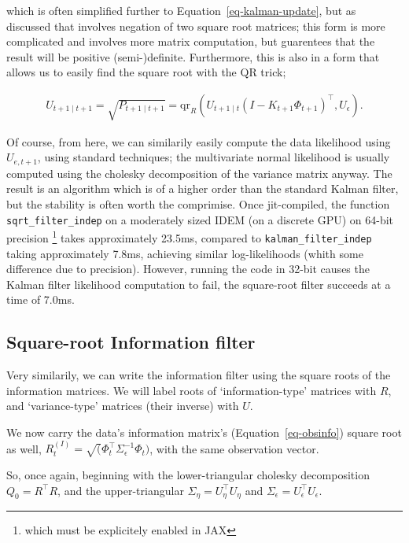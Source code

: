 \documentclass[
]{report}
\theoremstyle{plain}
\theoremstyle{plain}
\theoremstyle{plain}
\theoremstyle{remark}
\begin{document}
which is often simplified further to Equation~\ref{eq-kalman-update},
but as discussed that involves negation of two square root matrices;
this form is more complicated and involves more matrix computation, but
guarentees that the result will be positive (semi-)definite.
Furthermore, this is also in a form that allows us to easily find the
square root with the QR trick;

\[\begin{split}
U_{t+1\mid t+1} = \sqrt{P_{t+1\mid t+1}} = \mathrm{qr}_R(U_{t+1\mid t}(I - K_{t+1} \Phi_{t+1})^{\intercal}, U_\epsilon).
\end{split}
\]

Of course, from here, we can similarily easily compute the data
likelihood using \(U_{e,t+1}\), using standard techniques; the
multivariate normal likelihood is usually computed using the cholesky
decomposition of the variance matrix anyway. The result is an algorithm
which is of a higher order than the standard Kalman filter, but the
stability is often worth the comprimise. Once jit-compiled, the function
\texttt{sqrt\_filter\_indep} on a moderately sized IDEM (on a discrete
GPU) on 64-bit precision \footnote{which must be explicitely enabled in
  JAX} takes approximately 23.5ms, compared to
\texttt{kalman\_filter\_indep} taking approximately 7.8ms, achieving
similar log-likelihoods (whith some difference due to precision).
However, running the code in 32-bit causes the Kalman filter likelihood
computation to fail, the square-root filter succeeds at a time of 7.0ms.

\subsection{Square-root Information
filter}\label{square-root-information-filter}

Very similarily, we can write the information filter using the square
roots of the information matrices. We will label roots of
`information-type' matrices with \(R\), and `variance-type' matrices
(their inverse) with \(U\).

We now carry the data's information matrix's (Equation~\ref{eq-obsinfo})
square root as well,
\(R_t^{(I)} = \sqrt(\Phi_t^\intercal\Sigma_\epsilon^{-1} \Phi_t)\), with
the same observation vector.

So, once again, beginning with the lower-triangular cholesky
decomposition \(Q_0 = R^\intercal R\), and the upper-triangular
\(\Sigma_{\eta} = U_{\eta}^\intercal U_{\eta}\) and
\(\Sigma_\epsilon = U_{\epsilon}^\intercal U_{\epsilon}\).
\end{document}
